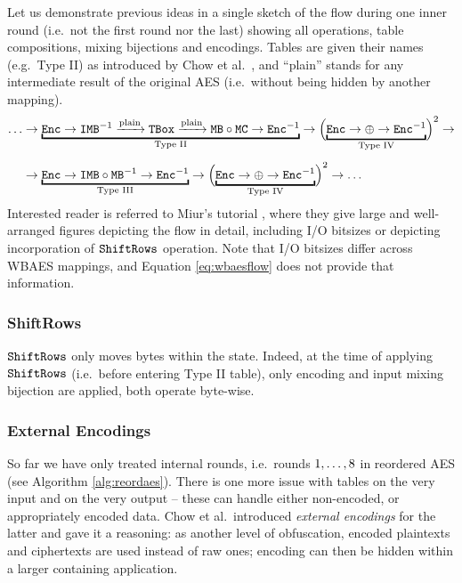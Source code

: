 	Let us demonstrate previous ideas in a single sketch of the flow during one inner round (i.e.\ not the first round nor the last) showing all operations, table compositions, mixing bijections and encodings. Tables are given their names (e.g.\ Type II) as introduced by Chow et al.\ \cite{chow2002aes}, and ``plain'' stands for any intermediate result of the original AES (i.e.\ without being hidden by another mapping).
	\begin{align}
	\label{eq:wbaesflow}
		\ldots&\rarr\underbracket{\Enc\rarr\IMB^{-1}\xrightarrow{\textnormal{plain}}\TBox\xrightarrow{\textnormal{plain}}\MB\circ\MC\rarr\Enc^{-1}}_{\textnormal{Type II}}\rarr\Bigl(\underbracket{\Enc\rarr\xor\rarr\Enc^{-1}}_{\textnormal{Type IV}}\Bigr)^2\rarr\nonumber\\[.5em]
		&\rarr\underbracket{\Enc\rarr\IMB\circ\MB^{-1}\rarr\Enc^{-1}}_{\textnormal{Type III}}\rarr\Bigl(\underbracket{\Enc\rarr\xor\rarr\Enc^{-1}}_{\textnormal{Type IV}}\Bigr)^2\rarr\ldots
	\end{align}
	Interested reader is referred to Miur's tutorial \cite{muir2013tutorial}, where they give large and well-arranged figures depicting the flow in detail, including I/O bitsizes or depicting incorporation of $\texttt{ShiftRows}$ operation. Note that I/O bitsizes differ across WBAES mappings, and Equation \ref{eq:wbaesflow} does not provide that information.
	
\subsubsection{ShiftRows}
	
	$\texttt{ShiftRows}$ only moves bytes within the state. Indeed, at the time of applying $\texttt{ShiftRows}$ (i.e.\ before entering Type II table), only encoding and input mixing bijection are applied, both operate byte-wise.

\subsubsection{External Encodings}
	
	So far we have only treated internal rounds, i.e.\ rounds $1 , \ldots , 8$ in reordered AES (see Algorithm \ref{alg:reordaes}). There is one more issue with tables on the very input and on the very output -- these can handle either non-encoded, or appropriately encoded data. Chow et al.\ introduced {\em external encodings} for the latter and gave it a reasoning: as another level of obfuscation, encoded plaintexts and ciphertexts are used instead of raw ones; encoding can then be hidden within a larger containing application. %
	
